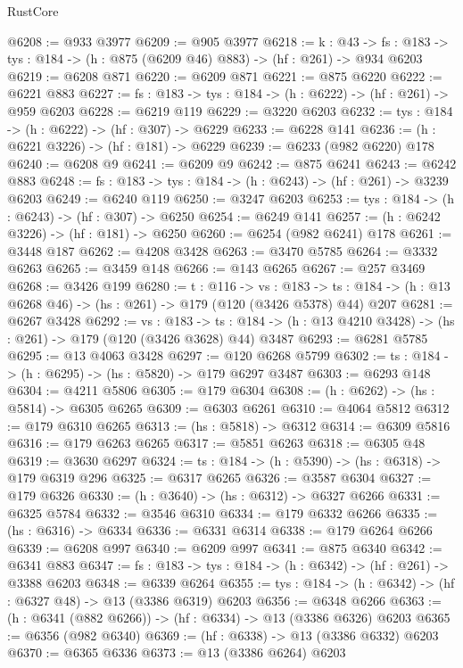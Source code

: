 \begin{lexlean}{RustCore}
\begin{coremodule}
@6208 := @933 @3977
@6209 := @905 @3977
@6218 := {k : @43} ->
  {fs : @183} -> {tys : @184} -> (h : @875 (@6209 @46) @883) -> (hf : @261) -> @934 @6203
@6219 := @6208 @871
@6220 := @6209 @871
@6221 := @875 @6220
@6222 := @6221 @883
@6227 := {fs : @183} -> {tys : @184} -> (h : @6222) -> (hf : @261) -> @959 @6203
@6228 := @6219 @119
@6229 := @3220 @6203
@6232 := {tys : @184} -> (h : @6222) -> (hf : @307) -> @6229
@6233 := @6228 @141
@6236 := (h : @6221 @3226) -> (hf : @181) -> @6229
@6239 := @6233 (@982 @6220) @178
@6240 := @6208 @9
@6241 := @6209 @9
@6242 := @875 @6241
@6243 := @6242 @883
@6248 := {fs : @183} -> {tys : @184} -> (h : @6243) -> (hf : @261) -> @3239 @6203
@6249 := @6240 @119
@6250 := @3247 @6203
@6253 := {tys : @184} -> (h : @6243) -> (hf : @307) -> @6250
@6254 := @6249 @141
@6257 := (h : @6242 @3226) -> (hf : @181) -> @6250
@6260 := @6254 (@982 @6241) @178
@6261 := @3448 @187
@6262 := @4208 @3428
@6263 := @3470 @5785
@6264 := @3332 @6263
@6265 := @3459 @148
@6266 := @143 @6265
@6267 := @257 @3469
@6268 := @3426 @199
@6280 := {t : @116} ->
  {vs : @183} ->
  {ts : @184} -> (h : @13 @6268 @46) -> (hs : @261) -> @179 (@120 (@3426 @5378) @44) @207
@6281 := @6267 @3428
@6292 := {vs : @183} ->
  {ts : @184} -> (h : @13 @4210 @3428) -> (hs : @261) -> @179 (@120 (@3426 @3628) @44) @3487
@6293 := @6281 @5785
@6295 := @13 @4063 @3428
@6297 := @120 @6268 @5799
@6302 := {ts : @184} -> (h : @6295) -> (hs : @5820) -> @179 @6297 @3487
@6303 := @6293 @148
@6304 := @4211 @5806
@6305 := @179 @6304
@6308 := (h : @6262) -> (hs : @5814) -> @6305 @6265
@6309 := @6303 @6261
@6310 := @4064 @5812
@6312 := @179 @6310 @6265
@6313 := (hs : @5818) -> @6312
@6314 := @6309 @5816
@6316 := @179 @6263 @6265
@6317 := @5851 @6263
@6318 := @6305 @48
@6319 := @3630 @6297
@6324 := {ts : @184} -> (h : @5390) -> (hs : @6318) -> @179 @6319 @296
@6325 := @6317 @6265
@6326 := @3587 @6304
@6327 := @179 @6326
@6330 := (h : @3640) -> (hs : @6312) -> @6327 @6266
@6331 := @6325 @5784
@6332 := @3546 @6310
@6334 := @179 @6332 @6266
@6335 := (hs : @6316) -> @6334
@6336 := @6331 @6314
@6338 := @179 @6264 @6266
@6339 := @6208 @997
@6340 := @6209 @997
@6341 := @875 @6340
@6342 := @6341 @883
@6347 := {fs : @183} -> {tys : @184} -> (h : @6342) -> (hf : @261) -> @3388 @6203
@6348 := @6339 @6264
@6355 := {tys : @184} -> (h : @6342) -> (hf : @6327 @48) -> @13 (@3386 @6319) @6203
@6356 := @6348 @6266
@6363 := (h : @6341 (@882 @6266)) -> (hf : @6334) -> @13 (@3386 @6326) @6203
@6365 := @6356 (@982 @6340)
@6369 := (hf : @6338) -> @13 (@3386 @6332) @6203
@6370 := @6365 @6336
@6373 := @13 (@3386 @6264) @6203

\end{coremodule}
\end{lexlean}
